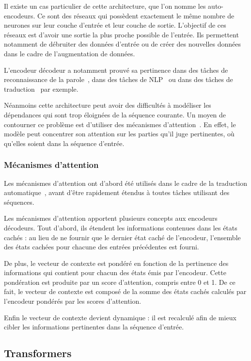 Il existe un cas particulier de cette architecture, que l'on nomme les auto-encodeurs. Ce sont des réseaux qui possèdent exactement le même nombre de neurones sur leur couche d'entrée et leur couche de sortie. L'objectif de ces réseaux est d'avoir une sortie la plus proche possible de l'entrée. Ils permettent notamment de débruiter des données d'entrée ou de créer des nouvelles données dans le cadre de l'augmentation de données.

L'encodeur décodeur a notamment prouvé sa pertinence dans des tâches de reconnaissance de la parole~\cite{Chiu2018}, dans des tâches de NLP~\cite{Hu2019} ou dans des tâches de traduction~\cite{Cho2014} par exemple.

Néanmoins cette architecture peut avoir des difficultés à modéliser les dépendances qui sont trop éloignées de la séquence courante. Un moyen de contourner ce problème est d'utiliser des mécanismes d'attention~\cite{Bahdanau2016}. En effet, le modèle peut concentrer son attention sur les parties qu'il juge pertinentes, où qu'elles soient dans la séquence d'entrée.

\subsubsection{Mécanismes d’attention}

Les mécanismes d'attention ont d'abord été utilisés dans le cadre de la traduction automatique~\cite{Luong2015}, avant d'être rapidement étendus à toutes tâches utilisant des séquences.

Les mécanismes d'attention apportent plusieurs concepts aux encodeurs décodeurs. Tout d'abord, ils étendent les informations contenues dans les états cachés : au lieu de ne fournir que le dernier état caché de l'encodeur, l'ensemble des états cachées pour chacune des entrées précédentes est fourni.

De plus, le vecteur de contexte est pondéré en fonction de la pertinence des informations qui contient pour chacun des états émis par l'encodeur. Cette pondération est produite par un score d'attention, compris entre 0 et 1. De ce fait, le vecteur de contexte est composé de la somme des états cachés calculés par l'encodeur pondérés par les scores d'attention.

Enfin le vecteur de contexte devient dynamique : il est recalculé afin de mieux cibler les informations pertinentes dans la séquence d'entrée.

\subsection{Transformers}

